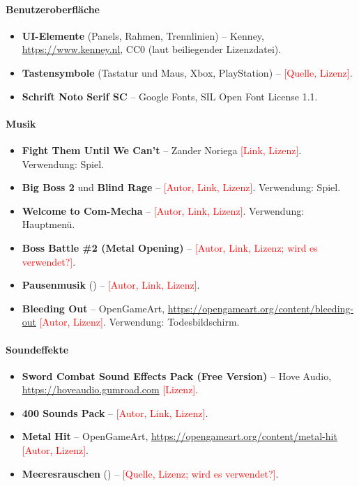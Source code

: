 \documentclass[../Main.tex]{subfiles}
\begin{document}
\paragraph{Benutzeroberfläche}
\begin{itemize}[leftmargin=1.5cm]
\item \textbf{UI-Elemente} (Panels, Rahmen, Trennlinien) -- Kenney, \url{https://www.kenney.nl}, CC0 (laut beiliegender Lizenzdatei).
\item \textbf{Tastensymbole} (Tastatur und Maus, Xbox, PlayStation) -- \textcolor{red}{[Quelle, Lizenz]}.
\item \textbf{Schrift Noto Serif SC} -- Google Fonts, SIL Open Font License 1.1.
\end{itemize}

\paragraph{Musik}
\begin{itemize}[leftmargin=1.5cm]
\item \textbf{Fight Them Until We Can't} -- Zander Noriega \textcolor{red}{[Link, Lizenz]}. Verwendung: Spiel.
\item \textbf{Big Boss 2} und \textbf{Blind Rage} -- \textcolor{red}{[Autor, Link, Lizenz]}. Verwendung: Spiel.
\item \textbf{Welcome to Com-Mecha} -- \textcolor{red}{[Autor, Link, Lizenz]}. Verwendung: Hauptmenü.
\item \textbf{Boss Battle \#2 (Metal Opening)} -- \textcolor{red}{[Autor, Link, Lizenz; wird es verwendet?]}.
\item \textbf{Pausenmusik} () -- \textcolor{red}{[Autor, Link, Lizenz]}.
\item \textbf{Bleeding Out} -- OpenGameArt, \url{https://opengameart.org/content/bleeding-out} \textcolor{red}{[Autor, Lizenz]}. Verwendung: Todesbildschirm.
\end{itemize}

\paragraph{Soundeffekte}
\begin{itemize}[leftmargin=1.5cm]
\item \textbf{Sword Combat Sound Effects Pack (Free Version)} -- Hove Audio, \url{https://hoveaudio.gumroad.com} \textcolor{red}{[Lizenz]}.
\item \textbf{400 Sounds Pack} -- \textcolor{red}{[Autor, Link, Lizenz]}.
\item \textbf{Metal Hit} -- OpenGameArt, \url{https://opengameart.org/content/metal-hit} \textcolor{red}{[Autor, Lizenz]}.
\item \textbf{Meeresrauschen} () -- \textcolor{red}{[Quelle, Lizenz; wird es verwendet?]}.
\end{itemize}
\end{document}
